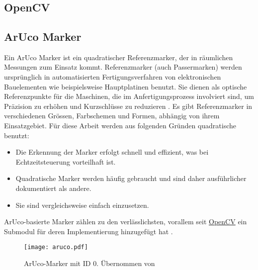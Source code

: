 \chapter{\chapTwo}
\label{sec:kapitel2} %

\begingroup
\fontsize{12pt}{14pt}\selectfont

\section{OpenCV}
\label{sec:opencv} %

\section{ArUco Marker}
Ein ArUco Marker ist ein quadratischer Referenzmarker, der in räumlichen Messungen zum Einsatz kommt. Referenzmarker (auch Passermarken) werden ursprünglich in automatisierten Fertigungsverfahren von elektronischen Bauelementen wie beispielsweise Hauptplatinen benutzt. Sie dienen als optische Referenzpunkte für die Maschinen, die im Anfertigungsprozess involviert sind, um Präzision zu erhöhen und Kurzschlüsse zu reduzieren \cite{Wiki:Passermarke}. 
Es gibt Referenzmarker in verschiedenen Grössen, Farbschemen und Formen, abhängig von ihrem Einsatzgebiet. Für diese Arbeit werden aus folgenden Gründen quadratische benutzt:

\begin{itemize}
  \item Die Erkennung der Marker erfolgt schnell und effizient, was bei Echtzeitsteuerung vorteilhaft ist.
  \item Quadratische Marker werden häufig gebraucht und sind daher ausführlicher dokumentiert als andere.
  \item Sie sind vergleichsweise einfach einzusetzen.
\end{itemize}

ArUco-basierte Marker zählen zu den verlässlichsten, vorallem seit \hyperref[sec:opencv]{OpenCV} ein Submodul für deren Implementierung hinzugefügt hat \cite{IJ:fiducial}.

\begin{figure}[h!]
    \centering
    \texttt{[image: aruco.pdf]}
    \caption{ArUco-Marker mit ID 0. Übernommen von \cite{chev:arucogen}}
    \label{fig:marker0}
\end{figure}

\endgroup